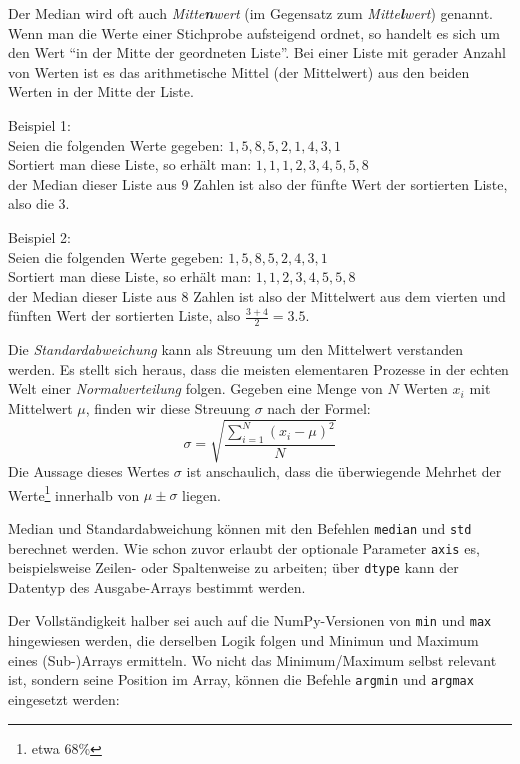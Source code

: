 \begin{hintbox}
Der Median wird oft auch \emph{Mitte\textbf{n}wert} (im Gegensatz zum \emph{Mitte\textbf{l}wert}) genannt. Wenn man die Werte einer Stichprobe aufsteigend ordnet, so handelt es sich um den Wert \enquote{in der Mitte der geordneten Liste}. Bei einer Liste mit gerader Anzahl von Werten ist es das arithmetische Mittel (der Mittelwert) aus den beiden Werten in der Mitte der Liste.

Beispiel 1:\\
Seien die folgenden Werte gegeben: \tab $1, 5, 8, 5, 2, 1, 4, 3, 1$\\
Sortiert man diese Liste, so erhält man: \tab $1, 1, 1, 2, 3, 4, 5, 5, 8$\\
der Median dieser Liste aus 9 Zahlen ist also der fünfte Wert der sortierten Liste, also die 3.

Beispiel 2:\\
Seien die folgenden Werte gegeben: \tab $1, 5, 8, 5, 2, 4, 3, 1$\\
Sortiert man diese Liste, so erhält man: \tab $1, 1, 2, 3, 4, 5, 5, 8$\\
der Median dieser Liste aus 8 Zahlen ist also der Mittelwert aus dem vierten und fünften Wert der sortierten Liste, also $\frac{3+4}{2} = 3.5$.

Die \emph{Standardabweichung} kann als Streuung um den Mittelwert verstanden werden. Es stellt sich heraus, dass die meisten elementaren Prozesse in der echten Welt einer \emph{Normalverteilung} folgen. Gegeben eine Menge von $N$ Werten $x_i$ mit Mittelwert $\mu$, finden wir diese Streuung $\sigma$ nach der Formel:
\[ \sigma = \sqrt{\frac{\sum_{i=1}^N (x_i - \mu)^2 }{N}} \]
Die Aussage dieses Wertes $\sigma$ ist anschaulich, dass die überwiegende Mehrhet der Werte\footnote{etwa 68\%} innerhalb von $\mu \pm \sigma$ liegen.
\end{hintbox}

Median und Standardabweichung können mit den Befehlen \texttt{median} und \texttt{std} berechnet werden. Wie schon zuvor erlaubt der optionale Parameter \texttt{axis} es, beispielsweise Zeilen- oder Spaltenweise zu arbeiten; über \texttt{dtype} kann der Datentyp des Ausgabe-Arrays bestimmt werden.

Der Vollständigkeit halber sei auch auf die NumPy-Versionen von \texttt{min} und \texttt{max} hingewiesen werden, die derselben Logik folgen und Minimun und Maximum eines (Sub-)Arrays ermitteln. Wo nicht das Minimum/Maximum selbst relevant ist, sondern seine Position im Array, können die Befehle \texttt{argmin} und \texttt{argmax} eingesetzt werden:

